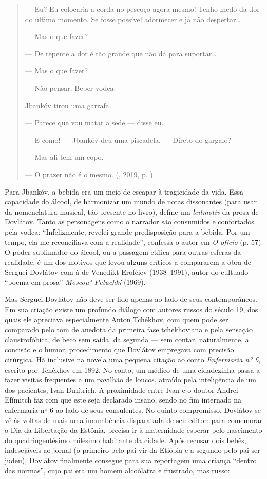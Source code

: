 \begin{quotation}
--- Eu? Eu colocaria a corda no pescoço agora mesmo! Tenho medo da dor
do último momento. Se fosse possível adormecer e já não despertar\ldots{}

--- Mas o que fazer?

--- De repente a dor é tão grande que não dá para suportar\ldots{}

--- Mas o que fazer?

--- Não pensar. Beber vodca.

Jbankóv tirou uma garrafa.

--- Parece que vou matar a sede --- disse eu.

--- E como! --- Jbankóv deu uma piscadela. --- Direto do gargalo?

--- Mas ali tem um copo.

--- O prazer não é o mesmo.
{}(, 2019, p. \pageref{ref01})
\end{quotation}

Para Jbankóv, a bebida era um meio de escapar à tragicidade da vida.
Essa capacidade do álcool, de harmonizar um mundo de notas dissonantes
(para usar da nomenclatura musical, tão presente no livro), define um
\emph{leitmotiv} da prosa de Dovlátov. Tanto as personagens como o
narrador são consumidos e confortados pela vodca: ``Infelizmente,
revelei grande predisposição para a bebida. Por um tempo, ela me
reconciliava com a realidade'', confessa o autor em \emph{O ofício} (p.
57). O poder sublimador do álcool, ou a passagem etílica para outras
esferas da realidade, é um dos motivos que levou alguns críticos a
compararem a obra de Serguei Dovlátov com à de Venedikt Eroféiev
(1938--1991), autor do cultuado ``poema em prosa''
\emph{Moscou"-Petuchki} (1969).

Mas Serguei Dovlátov não deve ser lido apenas ao lado de seus
contemporâneos. Em sua criação existe um profundo diálogo com autores
russos do século 19, dos quais ele apreciava especialmente Anton
Tchékhov, com quem pode ser comparado pelo tom de anedota da primeira
fase tchekhoviana e pela sensação claustrofóbica, de beco sem saída, da
segunda --- sem contar, naturalmente, a concisão e o humor, procedimento
que Dovlátov empregava com precisão cirúrgica. Há inclusive na novela
uma pequena citação ao conto \emph{Enfermaria nº 6}, escrito por
Tchékhov em 1892. No conto, um médico de uma cidadezinha passa a fazer
visitas frequentes a um pavilhão de loucos, atraído pela inteligência de
um dos pacientes, Ivan Dmítrich. A proximidade entre Ivan e o doutor
Andrei Efímitch faz com que este seja declarado insano, sendo no fim
internado na enfermaria nº 6 ao lado de seus consulentes. No quinto
compromisso, Dovlátov se vê às voltas de mais uma incumbência
disparatada de seu editor: para comemorar o Dia da Libertação da
Estônia, precisa ir à maternidade esperar pelo nascimento do
quadringentésimo milésimo habitante da cidade. Após recusar dois bebês,
indesejáveis ao jornal (o primeiro pelo pai vir da Etiópia e a segundo
pelo pai ser judeu), Dovlátov finalmente consegue para sua reportagem
uma criança ``dentro das normas'', cujo pai era um homem alcoólatra e
frustrado, mas russo:

